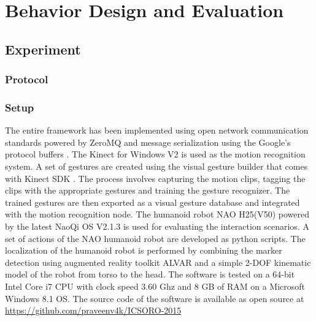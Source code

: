 
\chapter{Behavior Design and Evaluation} %

\label{Chapter6} %



\section{Experiment}

\subsection{Protocol}

\subsection{Setup}
\quad The entire framework has been implemented using open network communication standards powered by ZeroMQ \cite{ZeroMQ} and message serialization using the Google's protocol buffers \cite{ProtocolBuffers}. The Kinect for Windows V2 is used as the motion recognition system. A set of gestures are created using the visual gesture builder that comes with Kinect SDK \cite{Kinect2014}. The process involves capturing the motion clips, tagging the clips with the appropriate gestures and training the gesture recognizer. The trained gestures are then exported as a visual gesture database and integrated with the motion recognition node. The humanoid robot NAO H25(V50) powered by the latest NaoQi OS V2.1.3 is used for evaluating the interaction scenarios.  A set of actions of the NAO humanoid robot are developed as python scripts. The localization of the humanoid robot is performed by combining the marker detection using augmented reality toolkit ALVAR \cite{ALVAR} and a simple 2-DOF kinematic model of the robot from torso to the head. The software is tested on a 64-bit Intel Core i7 CPU with clock speed 3.60 Ghz and 8 GB of RAM on a Microsoft Windows 8.1 OS. The source code of the software is available as open source at \url{https://github.com/praveenv4k/ICSORO-2015}
